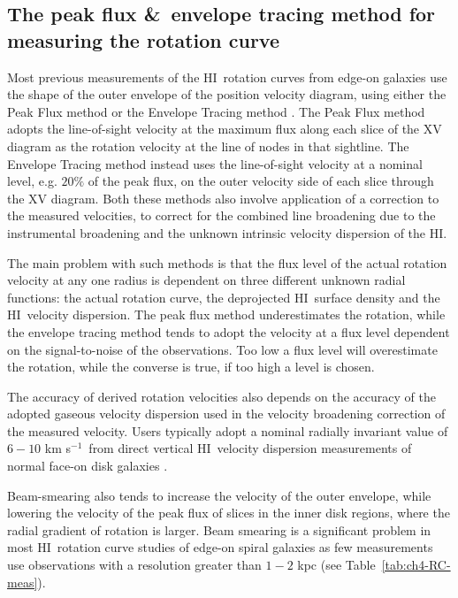 \documentclass[traditabstract]{aa} %
\newcommand\HI{H{\small I}}
\newcommand\kms{km s$^{-1}$}
\begin{document}
\subsection{The peak flux \&\ envelope tracing method for measuring
  the rotation curve}
\label{sec:peakflux-envtrac-RC}

Most previous measurements of the \HI\ rotation curves from edge-on
galaxies use the shape of
the outer envelope of the position velocity diagram, using either the
Peak Flux method \citep{rbft1985,mfb1992,um2003} or the
Envelope Tracing method \citep{sa1979,sofue1996,grsk2002}. The Peak
Flux method adopts the line-of-sight velocity at the maximum flux
along each slice of the XV diagram as the rotation velocity at the
line of nodes in that sightline. The Envelope Tracing
method instead uses the line-of-sight velocity at a nominal level,
e.g.  $20\%$ of the peak flux, on the outer velocity side of each
slice through the XV diagram.  Both these methods also involve application 
of a correction to the measured velocities, to correct for the 
combined line broadening due to the instrumental broadening and the 
unknown intrinsic velocity dispersion of the \HI.

The main problem with such methods is that the flux level of the
actual rotation velocity at any one radius is dependent on three
different unknown radial functions: the actual rotation curve, the
deprojected \HI\ surface density and the \HI\ velocity dispersion. The
peak flux method underestimates the rotation, while the envelope
tracing method tends to adopt the velocity at a flux level dependent
on the signal-to-noise of the observations. Too low a flux level will
overestimate the rotation, while the converse is true, if too high a
level is chosen.

The accuracy of derived rotation velocities also depends on the
accuracy of the adopted gaseous velocity dispersion used in the
velocity broadening correction of the measured velocity. Users
typically adopt a nominal radially invariant value of $6-10$ \kms\ from
direct vertical \HI\ velocity dispersion measurements of normal face-on
disk galaxies \citep{vdks1984,lsy1993}.

Beam-smearing also tends to increase the velocity of the outer
envelope, while lowering the velocity of the peak flux of slices in
the inner disk regions, where the radial gradient of rotation is larger.  
Beam smearing is a significant problem in most \HI\ rotation curve 
studies of edge-on spiral
galaxies as few measurements use observations with a resolution 
greater than $1-2$ kpc
(see Table~\ref{tab:ch4-RC-meas}).
\end{document}
